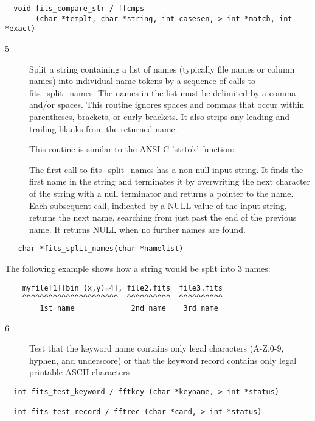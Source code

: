 \documentclass[11pt]{book}
\begin{document}
\begin{verbatim}
  void fits_compare_str / ffcmps
       (char *templt, char *string, int casesen, > int *match, int *exact)
\end{verbatim}

\begin{description}
\item[5 ]Split a string containing a list of names (typically file names or column
   names) into individual name tokens by a sequence of calls to
   fits\_split\_names.  The names in the list must be delimited by a comma
   and/or spaces.  This routine ignores spaces and commas that occur
   within parentheses, brackets, or curly brackets.  It also strips any
   leading and trailing blanks from the returned name.

   This routine is similar to the ANSI C 'strtok' function:

   The first call to fits\_split\_names has a non-null input string.
   It finds the first name in the string and terminates it by overwriting
   the next character of the string with a null terminator and returns a
   pointer to the name.  Each subsequent call, indicated by a NULL value
   of the input string, returns the next name, searching from just past
   the end of the previous name.  It returns NULL when no further names
  are found.  \label{splitnames}
\end{description}

\begin{verbatim}
   char *fits_split_names(char *namelist)
\end{verbatim}
   The following example shows how a string would be split into 3 names:

\begin{verbatim}
    myfile[1][bin (x,y)=4], file2.fits  file3.fits
    ^^^^^^^^^^^^^^^^^^^^^^  ^^^^^^^^^^  ^^^^^^^^^^
        1st name             2nd name    3rd name
\end{verbatim}

\begin{description}
\item[6 ] Test that the keyword name contains only legal characters (A-Z,0-9,
    hyphen, and underscore) or that the keyword record contains only legal
   printable ASCII characters  \label{fftkey} \label{fftrec}
\end{description}

\begin{verbatim}
  int fits_test_keyword / fftkey (char *keyname, > int *status)

  int fits_test_record / fftrec (char *card, > int *status)
\end{verbatim}
\end{document}
